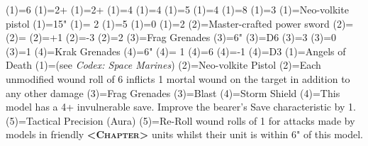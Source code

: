 \renewcommand{\UnitName}{Primaris Lieutenant }%
\renewcommand{\UnitPower}{4}%
\renewcommand{\UnitIcon}{HQ.svg}%
%
\renewcommand{\StatBlocks}{1}%
\Movement(1)={6}%
\WeaponSkill(1)={2+}%
\BalisticSkill(1)={2+}%
\Strength(1)={4}%
\Toughness(1)={4}%
\Wounds(1)={5}%
\Attacks(1)={4}%
\Leadership(1)={8}%
\Save(1)={3}%
%
\renewcommand{\UnitText}{1 \UnitName with: \WeaponName(1); \WeaponName(2); \WeaponName(3); \WeaponName(4); and \AbilityName(4).}%
%
\renewcommand{\NumWeapon}{4}%
\WeaponName(1)={Neo-volkite pistol}%
\WeaponRange(1)={15"}%
\WeaponType(1)={ 2}%
\WeaponStrength(1)={5}%
\WeaponAP(1)={0}%
\WeaponDamage(1)={2}%
%
\WeaponName(2)={Master-crafted power sword}%
\WeaponRange(2)={}%
\WeaponType(2)={}%
\WeaponStrength(2)={+1}%
\WeaponAP(2)={-3}%
\WeaponDamage(2)={2}%
%
\WeaponName(3)={Frag Grenades}%
\WeaponRange(3)={6"}%
\WeaponType(3)={D6}%
\WeaponStrength(3)={3}%
\WeaponAP(3)={0}%
\WeaponDamage(3)={1}%
%
\WeaponName(4)={Krak Grenades}%
\WeaponRange(4)={6"}%
\WeaponType(4)={ 1}%
\WeaponStrength(4)={6}%
\WeaponAP(4)={-1}%
\WeaponDamage(4)={D3}%
%
\renewcommand{\NumAbilities}{3}%
\AbilityName(1)={Angels of Death}%
\AbilityDescription(1)={(see \textit{Codex: Space Marines})}%
%
\AbilityName(2)={Neo-volkite Pistol}%
\AbilityDescription(2)={Each unmodified wound roll of 6 inflicts 1 mortal wound on the target in addition to any other damage}%
%
\AbilityName(3)={Frag Grenades}%
\AbilityDescription(3)={Blast}%
%
\AbilityName(4)={Storm Shield}%
\AbilityDescription(4)={This model has a 4+ invulnerable save.  Improve the bearer's Save characteristic by 1.}%
%
\AbilityName(5)={Tactical Precision (Aura)}%
\AbilityDescription(5)={Re-Roll wound rolls of 1 for attacks made by models in friendly \textbf{\textsc{<Chapter>}} units whilst their unit is within 6" of this model.}%
%
\renewcommand{\FactionKeywords}{Imperium, Adeptus Astartes, <Chapter>}%
\renewcommand{\Keywords}{Infantry, Character, \UnitName}%
%
\newcommand{\ExtraFrontTitle}{\AbilityName(5)}%
\renewcommand{\ExtraFrontText}{\AbilityDescription(5)}%
\newcommand{\ExtraBackTitle}{\AbilityName(4)}%
\renewcommand{\ExtraBackText}{\AbilityDescription(4)}%
\endinput%